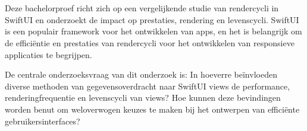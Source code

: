 
%
%
%
%
%

%



\chapter*{}

Deze bachelorproef richt zich op een vergelijkende studie van rendercycli in SwiftUI en onderzoekt de impact op prestaties, rendering en levenscycli. SwiftUI is een populair framework voor het ontwikkelen van apps, en het is belangrijk om de efficiëntie en prestaties van rendercycli voor het ontwikkelen van responsieve applicaties te begrijpen.

De centrale onderzoeksvraag van dit onderzoek is: In hoeverre beïnvloeden diverse methoden van gegevensoverdracht naar SwiftUI views de performance, renderingfrequentie en levenscycli van views? Hoe kunnen deze bevindingen worden benut om weloverwogen keuzes te maken bij het ontwerpen van efficiënte gebruikersinterfaces?

